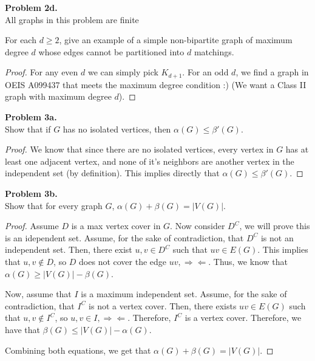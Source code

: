 \documentclass{article}
\newcommand{\size}[1]{|#1|}
\newcommand{\contradiction}{\Rightarrow\!\Leftarrow}
\newenvironment{hwproof}[2]
{
    \textbf{Problem #1.}\\
    #2
    \begin{proof}
}{
    \end{proof}
}
\begin{document}
\begin{hwproof}
    {2d}
    {All graphs in this problem are finite

        For each $d \geq 2$, give an example of a simple non-bipartite graph of maximum degree $d$ whose edges cannot be
        partitioned into $d$ matchings.}

    For any even $d$ we can simply pick $K_{d+1}$. For an odd $d$, we find a graph in OEIS A099437 that meets the maximum
    degree condition :) (We want a Class II graph with maximum degree $d$).
\end{hwproof}

\begin{hwproof}
    {3a}
    {Show that if $G$ has no isolated vertices, then $\alpha(G) \leq \beta'(G)$.}

    We know that since there are no isolated vertices,
    every vertex in $G$ has at least one adjacent vertex, and none of it's neighbors are another vertex in the
    independent set (by definition). This implies directly that $\alpha(G) \leq \beta'(G)$.
\end{hwproof}

\begin{hwproof}
    {3b}
    {Show that for every graph $G$, $\alpha(G) + \beta(G) = \size{V(G)}$.}

    Assume $D$ is a max vertex cover in $G$. Now consider $D^C$, we will prove this is an idependent set. Assume, for the sake of
    contradiction, that $D^C$ is not an independent set. Then, there exist $u,v \in D^C$ such that $uv \in E(G)$. This implies that
    $u,v \not\in D$, so $D$ does not cover the edge $uv, \contradiction$.
    Thus, we know that $\alpha(G) \geq \size{V(G)} - \beta(G)$.

    Now, assume that $I$ is a maximum independent set. Assume, for the sake of contradiction, that $I^C$ is not a vertex cover.
    Then, there exists $uv \in E(G)$ such that $u, v \not \in I^C$, so $u, v \in I, \contradiction$. Therefore, $I^C$ is a vertex cover.
    Therefore, we have that $\beta(G) \leq \size{V(G)} - \alpha(G)$.

    Combining both equations, we get that $\alpha(G) + \beta(G) = \size{V(G)}$.
\end{hwproof}
\end{document}
